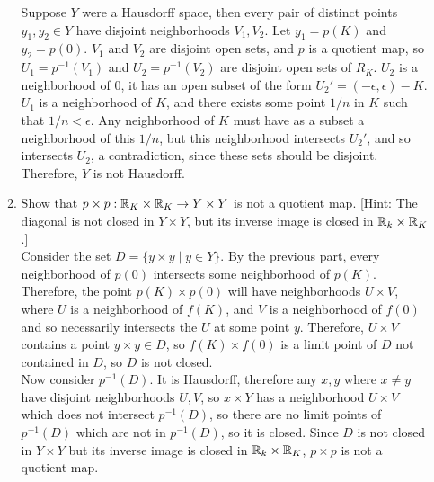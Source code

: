 \documentclass[12pt,letterpaper]{article}
\begin{document}
\begin{enumerate}
\begin{enumerate}
    Suppose $Y$ were a Hausdorff space, then every pair of distinct points $y_1,y_2\in Y$ have disjoint neighborhoods $V_1, V_2$. Let $y_1=p(K)$ and $y_2=p(0)$. $V_1$ and $V_2$ are disjoint open sets, and $p$ is a quotient map, so $U_1=p^{-1}(V_1)$ and $U_2=p^{-1}(V_2)$ are disjoint open sets of $R_K$. $U_2$ is a neighborhood of $0$, it has an open subset of the form $U_2'=(-\epsilon,\epsilon)-K$. $U_1$ is a neighborhood of $K$, and there exists some point $1/n$ in $K$ such that $1/n<\epsilon$. Any neighborhood of $K$ must have as a subset a neighborhood of this $1/n$, but this neighborhood intersects $U_2'$, and so intersects $U_2$, a contradiction, since these sets should be disjoint. Therefore, $Y$ is not Hausdorff.
    \item Show that $p\times p : \mathbb{R}_K\times \mathbb{R}_K \rightarrow Y\times Y$ is not a quotient map. [Hint: The diagonal is not closed in $Y\times Y$, but its inverse image is closed in $\mathbb{R}_k\times\mathbb{R}_K$.] \\
    Consider the set $D=\{y\times y\;|\;y\in Y\}$.  By the previous part, every neighborhood of $p(0)$ intersects some neighborhood of $p(K)$. Therefore, the point $p(K)\times p(0)$ will have neighborhoods $U\times V$, where $U$ is a neighborhood of $f(K)$, and $V$ is a neighborhood of $f(0)$ and so necessarily intersects the $U$ at some point $y$. Therefore, $U\times V$ contains a point $y\times y\in D$, so $f(K)\times f(0)$ is a limit point of $D$ not contained in $D$, so $D$ is not closed.\\
    Now consider $p^{-1}(D)$. It is Hausdorff, therefore any $x,y$ where $x\neq y$ have disjoint neighborhoods $U,V$, so $x\times Y$ has a neighborhood $U\times V$ which does not intersect $p^{-1}(D)$, so there are no limit points of $p^{-1}(D)$ which are not in $p^{-1}(D)$, so it is closed. Since $D$ is not closed in $Y\times Y$ but its inverse image is closed in $\mathbb{R}_k\times \mathbb{R}_K$, $p\times p$ is not a quotient map.
  \end{enumerate}
\end{enumerate}
\end{document}
